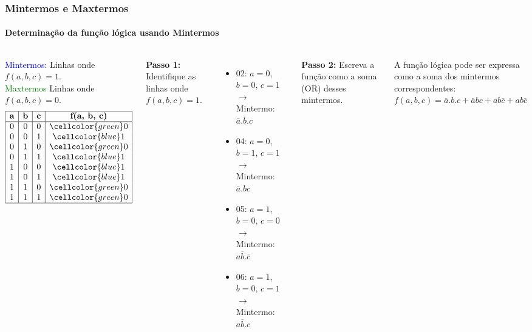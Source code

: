\begin{frame}
	\frametitle{Mintermos e Maxtermos}
	\framesubtitle{Determinação da função lógica usando Mintermos}
	\begin{columns}
			\par \textcolor{blue}{Mintermos}: Linhas onde $f(a, b, c) = 1$. \\ \textcolor{green}{Maxtermos} Linhas onde $f(a, b, c) = 0$.
			\[
			\begin{array}{|c|c|c|c|}
				\hline
				\textbf{a} & \textbf{b} & \textbf{c} & \textbf{f(a, b, c)} \\
				\hline
				0 & 0 & 0 & \cellcolor{green} 0 \\
				0 & 0 & 1 & \cellcolor{blue} 1 \\
				0 & 1 & 0 & \cellcolor{green} 0 \\
				0 & 1 & 1 & \cellcolor{blue} 1 \\
				1 & 0 & 0 & \cellcolor{blue} 1 \\
				1 & 0 & 1 & \cellcolor{blue} 1 \\
				1 & 1 & 0 & \cellcolor{green} 0 \\
				1 & 1 & 1 & \cellcolor{green} 0 \\
				\hline
			\end{array}
			\]
			\par \textbf{Passo 1:} Identifique as linhas onde \(f(a, b, c) = 1\).
			\begin{itemize}
				\item 02: \(a = 0\), \(b = 0\), \(c = 1\)  \(\rightarrow\) Mintermo: \(\overline{a}.\overline{b}.c\)
				\item 04: \(a = 0\), \(b = 1\), \(c = 1\)  \(\rightarrow\) Mintermo: \(\overline{a}.bc\)
				\item 05: \(a = 1\), \(b = 0\), \(c = 0\)  \(\rightarrow\) Mintermo: \(a\overline{b}.\overline{c}\)
				\item 06: \(a = 1\), \(b = 0\), \(c = 1\)  \(\rightarrow\) Mintermo: \(a\overline{b}.c\)
			\end{itemize}
			
			\par \textbf{Passo 2:} Escreva a função como a soma (OR) desses mintermos.\newline
			
			\par A função lógica pode ser expressa como a soma dos mintermos correspondentes: \\$\boxed{f(a, b, c) = \overline{a}.\overline{b}.c + \overline{a}bc + a\overline{b}\overline{c} + ab\overline{c}}$
	\end{columns}
	
\end{frame}


